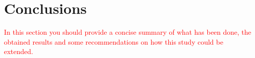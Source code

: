 \documentclass{scrartcl}
\begin{document}
\lipsum[4]

\section{Conclusions}
\label{sec:conclusions}

\textcolor{red}{In this section you should provide a concise summary of what has been done, the obtained results and some recommendations on how this study could be extended.}

\lipsum[4]



\end{document}
